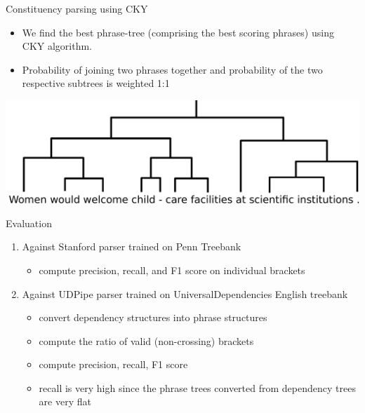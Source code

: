 \documentclass{beamer}
\begin{document}

\begin{frame}{Constituency parsing using CKY}
    \begin{itemize}
        \item We find the best phrase-tree (comprising the best scoring phrases) using CKY algorithm.
        \item Probability of joining two phrases together and probability of the two respective subtrees is weighted 1:1
    \end{itemize}
    \begin{center}
        \includegraphics[scale=0.3]{tree.pdf}
    \end{center}
\end{frame}


\begin{frame}{Evaluation}
\begin{enumerate}
    \item Against Stanford parser trained on Penn Treebank
    \begin{itemize}
        \item compute precision, recall, and F1 score on individual brackets
    \end{itemize}
    \item Against UDPipe parser trained on UniversalDependencies English treebank
    \begin{itemize}
        \item convert dependency structures into phrase structures
        \item compute the ratio of valid (non-crossing) brackets
        \item compute precision, recall, F1 score
        \item recall is very high since the phrase trees converted from dependency trees are very flat
    \end{itemize}
\end{enumerate}
\end{frame}
\end{document}
